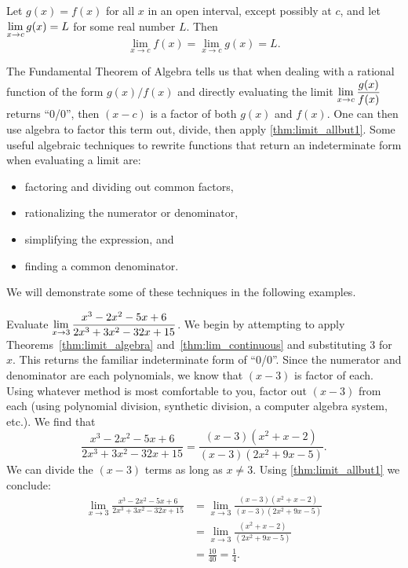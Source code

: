 \begin{theorem}\label{thm:limit_allbut1}%
Let $g(x) = f(x)$ for all $x$ in an open interval, except possibly at $c$, and let $\displaystyle \lim_{x\to c} g(x) = L$ for some real number $L$. Then
\[\lim_{x\to c} f(x)=\lim_{x\to c} g(x)=L.\]
\end{theorem}

The Fundamental Theorem of Algebra tells us that when dealing with a rational function of the form $g(x)/f(x)$ and directly evaluating the limit $\displaystyle \lim_{x\to c} \frac{g(x)}{f(x)}$ returns ``0/0'', 
then $(x-c)$ is a factor of both $g(x)$ and $f(x)$. One can then use algebra to factor this term out, divide, then apply \autoref{thm:limit_allbut1}. Some useful algebraic techniques to rewrite functions that return an indeterminate form when evaluating a limit are:
\begin{itemize}
\item factoring and dividing out common factors,
\item rationalizing the numerator or denominator,
\item simplifying the expression, and
\item finding a common denominator.
\end{itemize}
We will demonstrate some of these techniques in the following examples.

\begin{example}\label{ex_limit_allbut1}%
Evaluate $\displaystyle \lim_{x\to 3} \frac{x^3-2 x^2-5 x+6}{2 x^3+3 x^2-32 x+15}$.
\solution
We begin by attempting to apply Theorems~\ref{thm:limit_algebra} and~\ref{thm:lim_continuous} and substituting 3 for $x$. This returns the familiar indeterminate form of ``0/0''. %
Since the numerator and denominator are each polynomials, we know that $(x-3)$ is factor of each. Using whatever method is most comfortable to you, factor out $(x-3)$ from each (using polynomial division, synthetic division, a computer algebra system, etc.). We find that
\[
\frac{x^3-2 x^2-5 x+6}{2 x^3+3 x^2-32 x+15}
= \frac{(x-3)(x^2+x-2)}{(x-3)(2 x^2+9 x-5)}.
\]
We can divide the $(x-3)$ terms as long as $x\neq 3$. Using \autoref{thm:limit_allbut1} we conclude:\vspace{-.3\baselineskip}
	\begin{align*}
	\lim_{x\to 3} \frac{x^3-2 x^2-5 x+6}{2 x^3+3 x^2-32 x+15}
	&= \lim_{x\to 3}\frac{(x-3)(x^2+x-2)}{(x-3)(2 x^2+9 x-5)} \\
	&= \lim_{x\to 3} \frac{(x^2+x-2)}{(2 x^2+9 x-5)}\\
	&= \frac{10}{40} = \frac14.
	\end{align*}
\end{example}

